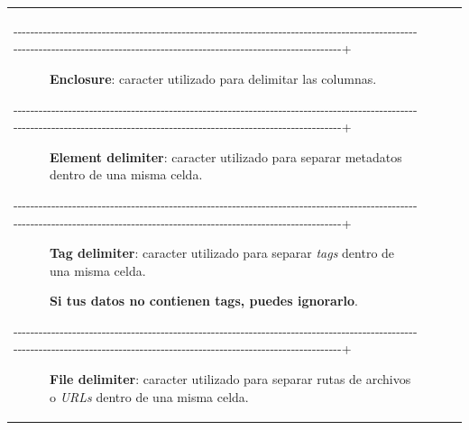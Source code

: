 \documentclass[
]{article}
\begin{document}
\begin{longtable}[]{@{}llll@{}}
\begin{minipage}[t]{0.22\columnwidth}
\begin{description}
\item[-\/-\/-\/-\/-\/-\/-\/-\/-\/-\/-\/-\/-\/-\/-\/-\/-\/-\/-\/-\/-\/-\/-\/-\/-\/-\/-\/-\/-\/-\/-\/-\/-\/-\/-\/-\/-\/-\/-\/-\/-\/-\/-\/-\/-\/-\/-\/-\/-\/-\/-\/-\/-\/-\/-\/-\/-\/-\/-\/-\/-\/-\/-\/-\/-\/-\/-\/-\/-\/-\/-\/-\/-\/-\/-\/-\/-\/-\/-\/-\/-\/-\/-\/-\/-\/-\/-\/-\/-\/-\/-\/-\/-\/-\/-\/-\/-\/-\/-\/-\/-\/-\/-\/-\/-\/-\/-\/-\/-\/-\/-\/-\/-\/-\/-\/-\/-\/-\/-\/-\/-\/-\/-\/-\/-\/-\/-\/-\/-\/-\/-\/-\/-\/-\/-\/-\/-\/-\/-\/-\/-\/-\/-\/-\/-\/-\/-\/-\/-\/-\/-\/-\/-\/-\/-\/-\/-\/-\/-\/-\/-\/-\/-\/-\/-\/-\/-\/-\/-\/-\/-\/-\/-\/-+]
\textbf{Enclosure}: caracter utilizado para delimitar las columnas.
\item[-\/-\/-\/-\/-\/-\/-\/-\/-\/-\/-\/-\/-\/-\/-\/-\/-\/-\/-\/-\/-\/-\/-\/-\/-\/-\/-\/-\/-\/-\/-\/-\/-\/-\/-\/-\/-\/-\/-\/-\/-\/-\/-\/-\/-\/-\/-\/-\/-\/-\/-\/-\/-\/-\/-\/-\/-\/-\/-\/-\/-\/-\/-\/-\/-\/-\/-\/-\/-\/-\/-\/-\/-\/-\/-\/-\/-\/-\/-\/-\/-\/-\/-\/-\/-\/-\/-\/-\/-\/-\/-\/-\/-\/-\/-\/-\/-\/-\/-\/-\/-\/-\/-\/-\/-\/-\/-\/-\/-\/-\/-\/-\/-\/-\/-\/-\/-\/-\/-\/-\/-\/-\/-\/-\/-\/-\/-\/-\/-\/-\/-\/-\/-\/-\/-\/-\/-\/-\/-\/-\/-\/-\/-\/-\/-\/-\/-\/-\/-\/-\/-\/-\/-\/-\/-\/-\/-\/-\/-\/-\/-\/-\/-\/-\/-\/-\/-\/-\/-\/-\/-\/-\/-\/-+]
\textbf{Element delimiter}: caracter utilizado para separar metadatos
dentro de una misma celda.
\item[-\/-\/-\/-\/-\/-\/-\/-\/-\/-\/-\/-\/-\/-\/-\/-\/-\/-\/-\/-\/-\/-\/-\/-\/-\/-\/-\/-\/-\/-\/-\/-\/-\/-\/-\/-\/-\/-\/-\/-\/-\/-\/-\/-\/-\/-\/-\/-\/-\/-\/-\/-\/-\/-\/-\/-\/-\/-\/-\/-\/-\/-\/-\/-\/-\/-\/-\/-\/-\/-\/-\/-\/-\/-\/-\/-\/-\/-\/-\/-\/-\/-\/-\/-\/-\/-\/-\/-\/-\/-\/-\/-\/-\/-\/-\/-\/-\/-\/-\/-\/-\/-\/-\/-\/-\/-\/-\/-\/-\/-\/-\/-\/-\/-\/-\/-\/-\/-\/-\/-\/-\/-\/-\/-\/-\/-\/-\/-\/-\/-\/-\/-\/-\/-\/-\/-\/-\/-\/-\/-\/-\/-\/-\/-\/-\/-\/-\/-\/-\/-\/-\/-\/-\/-\/-\/-\/-\/-\/-\/-\/-\/-\/-\/-\/-\/-\/-\/-\/-\/-\/-\/-\/-\/-+]
\textbf{Tag delimiter}: caracter utilizado para separar \emph{tags}
dentro de una misma celda.

\textbf{Si tus datos no contienen tags, puedes ignorarlo}.
\item[-\/-\/-\/-\/-\/-\/-\/-\/-\/-\/-\/-\/-\/-\/-\/-\/-\/-\/-\/-\/-\/-\/-\/-\/-\/-\/-\/-\/-\/-\/-\/-\/-\/-\/-\/-\/-\/-\/-\/-\/-\/-\/-\/-\/-\/-\/-\/-\/-\/-\/-\/-\/-\/-\/-\/-\/-\/-\/-\/-\/-\/-\/-\/-\/-\/-\/-\/-\/-\/-\/-\/-\/-\/-\/-\/-\/-\/-\/-\/-\/-\/-\/-\/-\/-\/-\/-\/-\/-\/-\/-\/-\/-\/-\/-\/-\/-\/-\/-\/-\/-\/-\/-\/-\/-\/-\/-\/-\/-\/-\/-\/-\/-\/-\/-\/-\/-\/-\/-\/-\/-\/-\/-\/-\/-\/-\/-\/-\/-\/-\/-\/-\/-\/-\/-\/-\/-\/-\/-\/-\/-\/-\/-\/-\/-\/-\/-\/-\/-\/-\/-\/-\/-\/-\/-\/-\/-\/-\/-\/-\/-\/-\/-\/-\/-\/-\/-\/-\/-\/-\/-\/-\/-\/-+]
\textbf{File delimiter}: caracter utilizado para separar rutas de
archivos o \emph{URLs} dentro de una misma celda.


\end{description}
\end{minipage}
\end{longtable}
\end{document}
